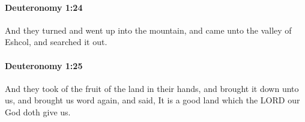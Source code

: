 		\paragraph{Deuteronomy 1:24} %
			\label{DEUTERONOMY-1-24}

			And they turned and went up into the mountain, and came unto the valley of Eshcol, and searched it out.


		\paragraph{Deuteronomy 1:25} %
			\label{DEUTERONOMY-1-25}

			And they took of the fruit of the land in their hands, and brought it down unto us, and brought us word again, and said, It is a good land which the LORD our God doth give us.


